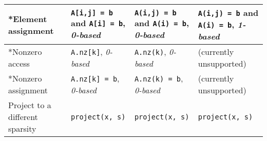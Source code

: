 \documentclass[a4paper,12pt]{book}
\begin{document}
\begin{center}
\begin{tabular}{| p{3.5cm} | p{3.5cm} | p{3.5cm} | p{3.5cm} | }
    *Element assignment
    & \verb|A[i,j] = b| and \verb|A[i] = b|, \linebreak \emph{0-based}
    & \verb|A(i,j) = b| and \verb|A(i) = b|, \linebreak \emph{0-based}
    & \verb|A(i,j) = b| and \verb|A(i) = b|, \linebreak \emph{1-based} \\ \hline
    *Nonzero access
    & \verb|A.nz[k]|, \emph{0-based}
    & \verb|A.nz(k)|, \emph{0-based}
    & (currently unsupported) \\ \hline
    *Nonzero assignment
    & \verb|A.nz[k] = b|, \emph{0-based}
    & \verb|A.nz(k) = b|, \emph{0-based}
    & (currently unsupported) \\ \hline
    Project to a different sparsity
    & \verb|project(x, s)| & \verb|project(x, s)| & \verb|project(x, s)| \\ \hline
  \end{tabular}
\end{center}

%
%
\end{document}
